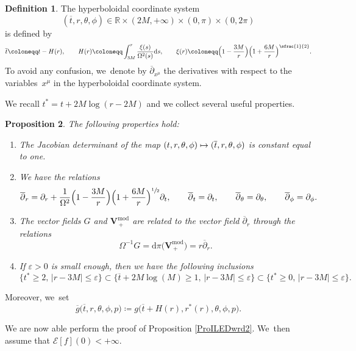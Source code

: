 \documentclass[JEP,XML,SOM,Unicode,published]{cedram}
\newcommand\mto{\mathchoice{\longmapsto}{\mapsto}{\mapsto}{\mapsto}}
\let\epsilon\varepsilon
\theoremstyle{plain}
\newtheorem{proposition}{Proposition}[section]
\theoremstyle{definition}
\newtheorem{definition}[proposition]{Definition}
\newcommand\R{{\mathbb{R}}}
\newcommand\dr{{\mathrm{d}}}
\begin{document}
\begin{definition}\label{Defhypcoor}
The hyperboloidal coordinate system
\[
(\overline{t},r,\theta, \phi) \in \R \times (2M,+\infty)\times (0, \pi) \times (0,2\pi)
\]
is defined by
\[
\overline{t} \coloneqq t-H(r), \qquad H(r)\coloneqq \int_{3M}^{r} \frac{\xi(s)}{\Omega^2(s)} \dr s, \qquad \xi(r) \coloneqq \Bigl(1-\frac{3M}{r} \Bigr)\Bigl(1+\frac{6M}{r}\Bigr)^{\sfrac{1}{2}}.
\]
To avoid any confusion, we~denote by $\overline{\partial}_{x^\mu}$ the derivatives with respect to the variables~$x^\mu$ in the hyperboloidal coordinate system.
\end{definition}
We recall $t^* = t+2M\log(r-2M)$ and we collect several useful properties.
\begin{proposition}\label{Prohyperboloidalcoord}
The following properties hold:
\begin{enumerate}
\item The Jacobian determinant of the map $(t,r,\theta, \phi) \mto (\overline{t},r,\theta, \phi)$ is constant equal to one.
\item We have the relations
\[
\overline{\partial}_r= \partial_r+\frac{1}{\Omega^2}\Bigl(1-\frac{3M}{r} \Bigr)\Bigl(1+\frac{6M}{r}\Bigr)^{\sfrac{1}{2}}\partial_t, \qquad \overline{\partial}_t = \partial_t, \qquad \overline{\partial}_\theta = \partial_\theta, \qquad \overline{\partial}_\phi = \partial_\phi.
\]
\item The vector fields $G$ and $\pmb{V}_{\, +}^{ \mathrm{mod}}$ are related to the vector field $\overline{\partial}_r$ through the relations
\[
\Omega^{-1}G=\dr \pi \bigl(\pmb{V}_{\, +}^{ \mathrm{mod}} \bigr)= r \overline{\partial}_r.
\]
\item If $\epsilon >0$ is small enough, then we have the following inclusions
\[
\bigl\{ t^* \geq 2, \, |r-3M| \leq \epsilon \bigr\} \! \subset \bigl\{ \overline{t}+2M\log(M) \geq 1, \, |r-3M| \leq \epsilon \bigr\} \! \subset \bigl\{ t^* \geq 0, \, |r-3M| \leq \epsilon \bigr\}.
\]
\end{enumerate}
\end{proposition}

Moreover, we~set
\[
\overline{g}\bigl(\overline{t},r,\theta,\phi,p\bigr)\coloneqq g\bigl(\overline{t}+H(r),r^*(r),\theta,\phi,p\bigr).
\]

We are now able perform the proof of Proposition \ref{ProILEDwrd2}. We~then assume that $\mathcal{E}[f](0)<+\infty$.
\end{document}
